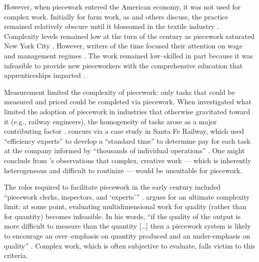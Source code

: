 \documentclass[trackingWork]{subfiles}
\begin{document}
However, when piecework entered the American economy,
it was not used for complex work.
Initially for farm work, as
\citeauthor{hughRaynbirdTaskWork} and others discuss,
the practice remained relatively obscure until
it blossomed in the textile industry
\cite{hughRaynbirdTaskWork}.
Complexity levels remained low at the turn of
the  century as piecework saturated New York City
\cite{riisOtherSideLives}.
However, writers of the time focused their attention on
wage \cite{burton1899commercial} and
management regimes \cite{norton1900textile}.
The work remained low--skilled in part because
it was infeasible to provide new pieceworkers with the comprehensive education
that apprenticeships imparted \cite{hart2013rise}.

Measurement limited the complexity of piecework:
only tasks that could be measured and priced could be completed via piecework. 
When \citeauthor{Brown01041990} investigated
what limited the adoption of piecework in industries that otherwise gravitated toward it
(e.g., railway engineers),
the homogeneity of tasks arose as a major contributing factor
\cite{Brown01041990}.
\citeauthor{10.2307/23702539} concurs via a case study in Santa Fe Railway,
which used ``efficiency experts'' to develop a ``standard time''
to determine pay for each task at the company informed by
``thousands of individual operations'' %
\cite{10.2307/23702539}.
One might conclude from \citeauthor{10.2307/23702539}'s observations that
complex, creative work
--- which is inherently heterogeneous and difficult to routinize ---
would be unsuitable for piecework.

The roles required to facilitate piecework in the early  century included
``piecework clerks, inspectors, and `experts'''
\cite{10.2307/23702539}.
\citeauthor{hart2016rise} argues for an ultimate complexity limit:
at some point, evaluating multidimensional work for quality
(rather than for quantity) becomes infeasible.
In his words,
``if the quality of the output is more difficult to measure than the quantity [\ldots]
then a piecework system is likely to encourage
an over--emphasis on quantity produced and an under-emphasis on quality''
\cite{hart2016rise}.
Complex work, which is often subjective to evaluate, falls victim to this criteria.
\end{document}
